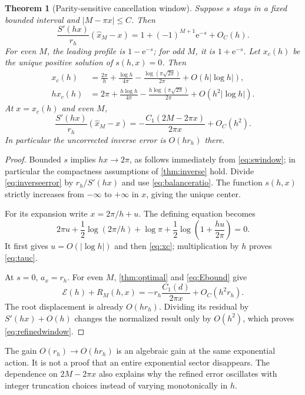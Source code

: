 \documentclass[11pt,a4paper]{article}
\newcommand{\ee}{\mathrm e}
\newcommand{\E}{\mathcal E}
\numberwithin{equation}{section}
\theoremstyle{plain}
\newtheorem{theorem}{Theorem}[section]
\theoremstyle{definition}
\theoremstyle{remark}
\begin{document}
\begin{theorem}[Parity-sensitive cancellation window]
\label{thm:window}
Suppose $s$ stays in a fixed bounded interval and $|M-\pi x|\le C$.
Then
\begin{equation}
 \boxed{\frac{S'(hx)}{r_h}(\widehat x_M-x)
         =1+(-1)^{M+1}\ee^{-s}+O_C(h).}
 \label{eq:profile}
\end{equation}
For even $M$, the leading profile is $1-\ee^{-s}$; for odd $M$, it is
$1+\ee^{-s}$. Let $x_c(h)$ be the unique positive solution of $s(h,x)=0$.
Then
\begin{align}
 x_c(h)&=\frac{2\pi}{h}+\frac{\log h}{4\pi}
            -\frac{\log(\pi\sqrt{2\pi})}{2\pi}
              +O(h|\log h|),\label{eq:xc}\\
 hx_c(h)&=2\pi+\frac{h\log h}{4\pi}
            -\frac{h\log(\pi\sqrt{2\pi})}{2\pi}
              +O(h^2|\log h|).\label{eq:tauc}
\end{align}
At $x=x_c(h)$ and even $M$,
\begin{equation}
 \frac{S'(hx)}{r_h}(\widehat x_M-x)
       =-\frac{C_1(2M-2\pi x)}{2\pi x}+O_C(h^2).
 \label{eq:refinedwindow}
\end{equation}
In particular the uncorrected inverse error is $O(hr_h)$ there.
\end{theorem}
\begin{proof}
Bounded $s$ implies $hx\to2\pi$, as follows immediately from
\eqref{eq:swindow}; in particular the compactness assumptions of
\cref{thm:inverse} hold. Divide \eqref{eq:inverseerror} by $r_h/S'(hx)$ and
use \eqref{eq:balanceratio}. The function $s(h,x)$ strictly increases from
$-\infty$ to $+\infty$ in $x$, giving the unique center.

For its expansion write $x=2\pi/h+u$. The defining equation becomes
\[
 2\pi u+\frac12\log(2\pi/h)+\log\pi
         +\frac12\log\left(1+\frac{hu}{2\pi}\right)=0.
\]
It first gives $u=O(|\log h|)$ and then \eqref{eq:xc}; multiplication by
$h$ proves \eqref{eq:tauc}.

At $s=0$, $a_x=r_h$. For even $M$, \cref{thm:optimal} and
\eqref{eq:Ebound} give
\[
 \E(h)+R_M(h,x)=-r_h\frac{C_1(d)}{2\pi x}+O_C(h^2r_h).
\]
The root displacement is already $O(hr_h)$. Dividing its residual by
$S'(hx)+O(h)$ changes the normalized result only by $O(h^2)$, which proves
\eqref{eq:refinedwindow}.
\end{proof}

The gain $O(r_h)\to O(hr_h)$ is an algebraic gain at the same exponential
action. It is not a proof that an entire exponential sector disappears.
The dependence on $2M-2\pi x$ also explains why the refined error oscillates
with integer truncation choices instead of varying monotonically in $h$.
\end{document}
